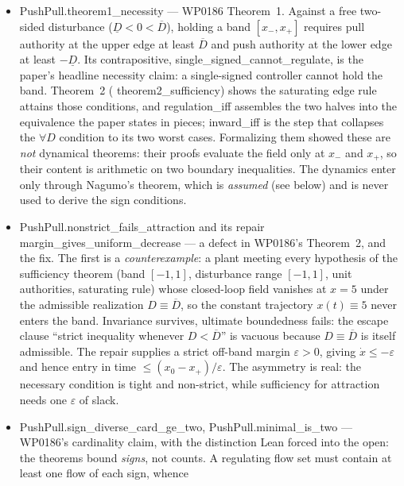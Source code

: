 \documentclass[11pt,a4paper]{article}
\newcommand{\lean}[1]{{\ttfamily\small
  \let\leanunderscore\_\def\_{\leanunderscore\allowbreak}#1}}
\newcommand{\Ik}{\mathrm{I}_K}
\begin{document}
\begin{itemize}[leftmargin=1.4em,itemsep=1pt]
is not an AIT quantity and is not formalized here. Keeping the two apart is the whole point.)
Satisfiability witness: \lean{ShiftFrame}, in which the bound is tight,
$\Ik(x:\sigma_s x)=K(x)$.
\item \lean{PushPull.theorem1\_necessity} --- WP0186 Theorem~1. Against a free two-sided
disturbance ($\underline{D}<0<\overline{D}$), holding a band $[x_-,x_+]$ requires pull authority at
the upper edge at least $\overline{D}$ and push authority at the lower edge at least
$-\underline{D}$. Its contrapositive, \lean{single\_signed\_cannot\_regulate}, is the paper's
headline necessity claim: a single-signed controller cannot hold the band. Theorem~2
(\lean{theorem2\_sufficiency}) shows the saturating edge rule attains those conditions, and
\lean{regulation\_iff} assembles the two halves into the equivalence the paper states in pieces;
\lean{inward\_iff} is the step that collapses the $\forall D$ condition to its two worst cases.
Formalizing them showed these are \emph{not} dynamical theorems: their proofs evaluate the field
only at $x_-$ and $x_+$, so their content is arithmetic on two boundary inequalities. The dynamics
enter only through Nagumo's theorem, which is \emph{assumed} (see below) and is never used to
derive the sign conditions.
\item \lean{PushPull.nonstrict\_fails\_attraction} and its repair
\lean{margin\_gives\_uniform\_decrease}
--- a defect in WP0186's Theorem~2, and the fix. The first is a \emph{counterexample}: a plant
meeting every hypothesis of the sufficiency theorem (band $[-1,1]$, disturbance range $[-1,1]$, unit
authorities, saturating rule) whose closed-loop field vanishes at $x=5$ under the admissible
realization $D\equiv\overline{D}$, so the constant trajectory $x(t)\equiv 5$ never enters the band.
Invariance survives, ultimate boundedness fails: the escape clause ``strict inequality whenever
$D<\overline{D}$'' is vacuous because $D\equiv\overline{D}$ is itself admissible. The repair supplies a strict
off-band margin $\varepsilon>0$, giving $\dot x\le-\varepsilon$ and hence entry in
time $\le(x_0-x_+)/\varepsilon$. The asymmetry is real: the necessary condition is tight and
non-strict, while sufficiency for attraction needs one $\varepsilon$ of slack.
\item \lean{PushPull.sign\_diverse\_card\_ge\_two}, \lean{PushPull.minimal\_is\_two} --- WP0186's
cardinality claim, with the distinction Lean forced into the open: the theorems bound \emph{signs},
not counts. A regulating flow set must contain at least one flow of each sign, whence

\end{itemize}
\end{document}
